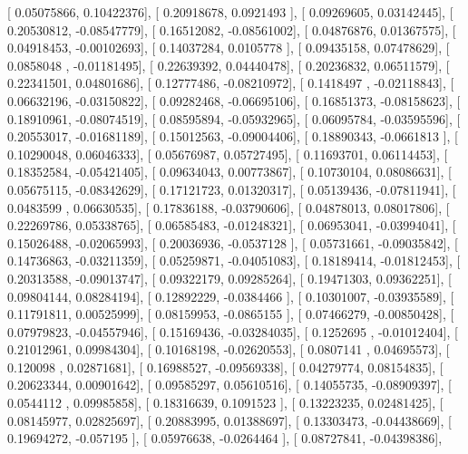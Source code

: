\documentclass{article}
\begin{document}
       [ 0.05075866,  0.10422376],
       [ 0.20918678,  0.0921493 ],
       [ 0.09269605,  0.03142445],
       [ 0.20530812, -0.08547779],
       [ 0.16512082, -0.08561002],
       [ 0.04876876,  0.01367575],
       [ 0.04918453, -0.00102693],
       [ 0.14037284,  0.0105778 ],
       [ 0.09435158,  0.07478629],
       [ 0.0858048 , -0.01181495],
       [ 0.22639392,  0.04440478],
       [ 0.20236832,  0.06511579],
       [ 0.22341501,  0.04801686],
       [ 0.12777486, -0.08210972],
       [ 0.1418497 , -0.02118843],
       [ 0.06632196, -0.03150822],
       [ 0.09282468, -0.06695106],
       [ 0.16851373, -0.08158623],
       [ 0.18910961, -0.08074519],
       [ 0.08595894, -0.05932965],
       [ 0.06095784, -0.03595596],
       [ 0.20553017, -0.01681189],
       [ 0.15012563, -0.09004406],
       [ 0.18890343, -0.0661813 ],
       [ 0.10290048,  0.06046333],
       [ 0.05676987,  0.05727495],
       [ 0.11693701,  0.06114453],
       [ 0.18352584, -0.05421405],
       [ 0.09634043,  0.00773867],
       [ 0.10730104,  0.08086631],
       [ 0.05675115, -0.08342629],
       [ 0.17121723,  0.01320317],
       [ 0.05139436, -0.07811941],
       [ 0.0483599 ,  0.06630535],
       [ 0.17836188, -0.03790606],
       [ 0.04878013,  0.08017806],
       [ 0.22269786,  0.05338765],
       [ 0.06585483, -0.01248321],
       [ 0.06953041, -0.03994041],
       [ 0.15026488, -0.02065993],
       [ 0.20036936, -0.0537128 ],
       [ 0.05731661, -0.09035842],
       [ 0.14736863, -0.03211359],
       [ 0.05259871, -0.04051083],
       [ 0.18189414, -0.01812453],
       [ 0.20313588, -0.09013747],
       [ 0.09322179,  0.09285264],
       [ 0.19471303,  0.09362251],
       [ 0.09804144,  0.08284194],
       [ 0.12892229, -0.0384466 ],
       [ 0.10301007, -0.03935589],
       [ 0.11791811,  0.00525999],
       [ 0.08159953, -0.0865155 ],
       [ 0.07466279, -0.00850428],
       [ 0.07979823, -0.04557946],
       [ 0.15169436, -0.03284035],
       [ 0.1252695 , -0.01012404],
       [ 0.21012961,  0.09984304],
       [ 0.10168198, -0.02620553],
       [ 0.0807141 ,  0.04695573],
       [ 0.120098  ,  0.02871681],
       [ 0.16988527, -0.09569338],
       [ 0.04279774,  0.08154835],
       [ 0.20623344,  0.00901642],
       [ 0.09585297,  0.05610516],
       [ 0.14055735, -0.08909397],
       [ 0.0544112 ,  0.09985858],
       [ 0.18316639,  0.1091523 ],
       [ 0.13223235,  0.02481425],
       [ 0.08145977,  0.02825697],
       [ 0.20883995,  0.01388697],
       [ 0.13303473, -0.04438669],
       [ 0.19694272, -0.057195  ],
       [ 0.05976638, -0.0264464 ],
       [ 0.08727841, -0.04398386],
\end{document}
